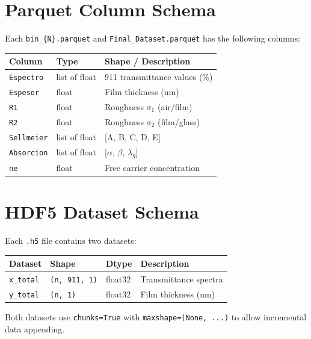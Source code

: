 \documentclass[11pt,a4paper]{article}
\begin{document}
\section{Parquet Column Schema}

Each {\tt bin\_\{N\}.parquet} and {\tt Final\_Dataset.parquet} has the following columns:

\begin{table}[htbp]
\centering
\begin{tabular}{lll}
\toprule
\textbf{Column} & \textbf{Type} & \textbf{Shape / Description} \\
\midrule
{\tt Espectro}   & list of float & 911 transmittance values (\%) \\
{\tt Espesor}    & float         & Film thickness (nm) \\
{\tt R1}         & float         & Roughness $\sigma_1$ (air/film) \\
{\tt R2}         & float         & Roughness $\sigma_2$ (film/glass) \\
{\tt Sellmeier}  & list of float & [A, B, C, D, E] \\
{\tt Absorcion}  & list of float & [$\alpha$, $\beta$, $\lambda_g$] \\
{\tt ne}         & float         & Free carrier concentration \\
\bottomrule
\end{tabular}
\end{table}

\section{HDF5 Dataset Schema}

Each {\tt .h5} file contains two datasets:

\begin{table}[htbp]
\centering
\begin{tabular}{llll}
\toprule
\textbf{Dataset} & \textbf{Shape} & \textbf{Dtype} & \textbf{Description} \\
\midrule
{\tt x\_total} & {\tt (n, 911, 1)} & float32 & Transmittance spectra \\
{\tt y\_total} & {\tt (n, 1)}      & float32 & Film thickness (nm) \\
\bottomrule
\end{tabular}
\end{table}

Both datasets use {\tt chunks=True} with {\tt maxshape=(None, ...)} to allow incremental data appending.
\end{document}
